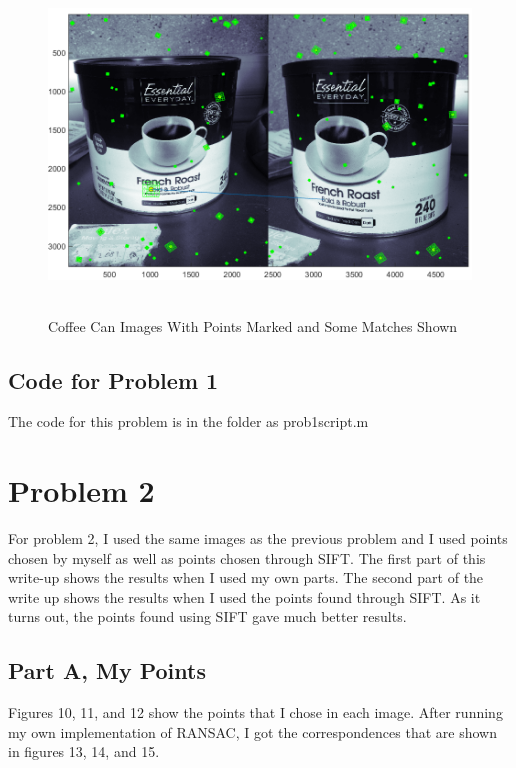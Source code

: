 \documentclass[11pt,psfig]{article}
\begin{document}
\begin{figure}[H]
\centering
\includegraphics[height=3.5in]{coffeeCan_pointsWithMatching.png}
\caption{Coffee Can Images With Points Marked and Some Matches Shown}
\label{cc3}
\end{figure}

\subsection*{Code for Problem 1}

The code for this problem is in the folder as prob1script.m

\newpage

\section*{Problem 2}

For problem 2, I used the same images as the previous problem and I used points chosen by myself as well as points chosen through SIFT. The first part of this write-up shows the results when I used my own parts. The second part of the write up shows the results when I used the points found through SIFT. As it turns out, the points found using SIFT gave much better results. 

\subsection*{Part A, My Points}

Figures 10, 11, and 12 show the points that I chose in each image. After running my own implementation of RANSAC, I got the correspondences that are shown in figures 13, 14, and 15.
\end{document}
